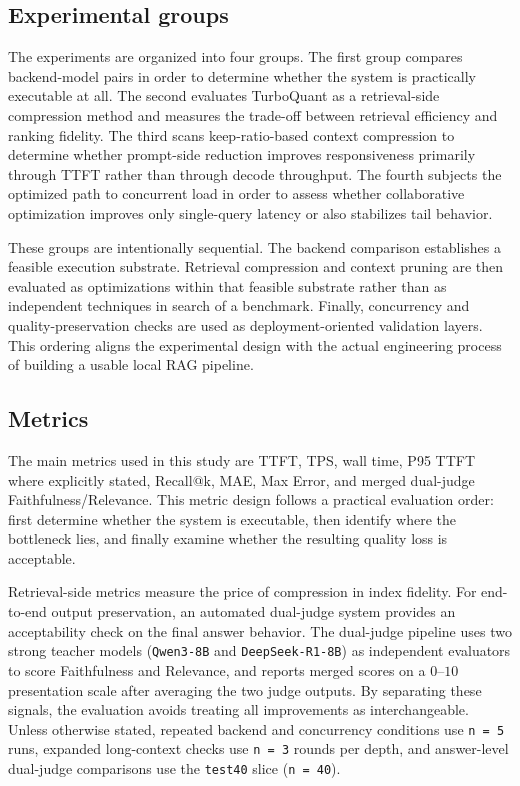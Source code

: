 \documentclass[10pt,twocolumn]{article}
\begin{document}
\subsection{Experimental groups}

The experiments are organized into four groups. The first group compares backend-model pairs in order to determine whether the system is practically executable at all. The second evaluates TurboQuant as a retrieval-side compression method and measures the trade-off between retrieval efficiency and ranking fidelity. The third scans keep-ratio-based context compression to determine whether prompt-side reduction improves responsiveness primarily through TTFT rather than through decode throughput. The fourth subjects the optimized path to concurrent load in order to assess whether collaborative optimization improves only single-query latency or also stabilizes tail behavior.

These groups are intentionally sequential. The backend comparison establishes a feasible execution substrate. Retrieval compression and context pruning are then evaluated as optimizations within that feasible substrate rather than as independent techniques in search of a benchmark. Finally, concurrency and quality-preservation checks are used as deployment-oriented validation layers. This ordering aligns the experimental design with the actual engineering process of building a usable local RAG pipeline.

\subsection{Metrics}

The main metrics used in this study are TTFT, TPS, wall time, P95 TTFT where explicitly stated, Recall@k, MAE, Max Error, and merged dual-judge Faithfulness/Relevance. This metric design follows a practical evaluation order: first determine whether the system is executable, then identify where the bottleneck lies, and finally examine whether the resulting quality loss is acceptable.

Retrieval-side metrics measure the price of compression in index fidelity. For end-to-end output preservation, an automated dual-judge system provides an acceptability check on the final answer behavior. The dual-judge pipeline uses two strong teacher models (\texttt{Qwen3-8B} and \texttt{DeepSeek-R1-8B}) as independent evaluators to score Faithfulness and Relevance, and reports merged scores on a $0$--$10$ presentation scale after averaging the two judge outputs. By separating these signals, the evaluation avoids treating all improvements as interchangeable. Unless otherwise stated, repeated backend and concurrency conditions use \texttt{n = 5} runs, expanded long-context checks use \texttt{n = 3} rounds per depth, and answer-level dual-judge comparisons use the \texttt{test40} slice (\texttt{n = 40}).
\end{document}
